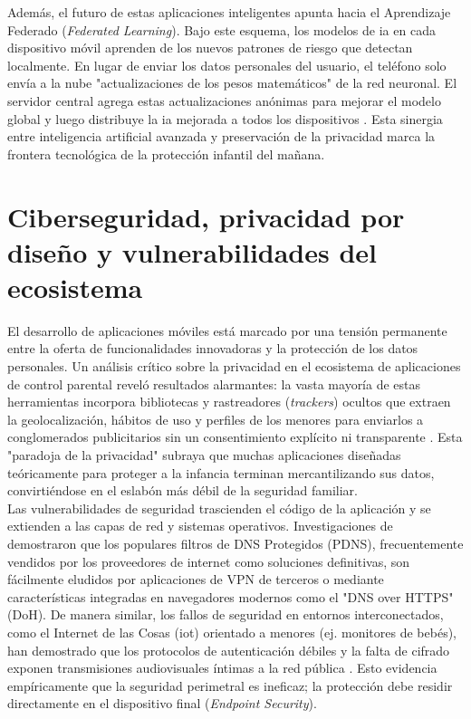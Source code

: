 Además, el futuro de estas aplicaciones inteligentes apunta hacia el Aprendizaje Federado (\textit{Federated Learning}). Bajo este esquema, los modelos de \gls{ia} en cada dispositivo móvil aprenden de los nuevos patrones de riesgo que detectan localmente. En lugar de enviar los datos personales del usuario, el teléfono solo envía a la nube "actualizaciones de los pesos matemáticos" de la red neuronal. El servidor central agrega estas actualizaciones anónimas para mejorar el modelo global y luego distribuye la \gls{ia} mejorada a todos los dispositivos \cite{oladimeji_smart_2023}. Esta sinergia entre inteligencia artificial avanzada y preservación de la privacidad marca la frontera tecnológica de la protección infantil del mañana.\\

\section{Ciberseguridad, privacidad por diseño y vulnerabilidades del ecosistema}

El desarrollo de aplicaciones móviles está marcado por una tensión permanente entre la oferta de funcionalidades innovadoras y la protección de los datos personales. Un análisis crítico sobre la privacidad en el ecosistema de aplicaciones de control parental reveló resultados alarmantes: la vasta mayoría de estas herramientas incorpora bibliotecas y rastreadores (\textit{trackers}) ocultos que extraen la geolocalización, hábitos de uso y perfiles de los menores para enviarlos a conglomerados publicitarios sin un consentimiento explícito ni transparente \cite{feal_angel_2020}. Esta "paradoja de la privacidad" subraya que muchas aplicaciones diseñadas teóricamente para proteger a la infancia terminan mercantilizando sus datos, convirtiéndose en el eslabón más débil de la seguridad familiar.\\

Las vulnerabilidades de seguridad trascienden el código de la aplicación y se extienden a las capas de red y sistemas operativos. Investigaciones de \cite{rojas_technical_2025} demostraron que los populares filtros de DNS Protegidos (PDNS), frecuentemente vendidos por los proveedores de internet como soluciones definitivas, son fácilmente eludidos por aplicaciones de VPN de terceros o mediante características integradas en navegadores modernos como el "DNS over HTTPS" (DoH). De manera similar, los fallos de seguridad en entornos interconectados, como el Internet de las Cosas (\gls{iot}) orientado a menores (ej. monitores de bebés), han demostrado que los protocolos de autenticación débiles y la falta de cifrado exponen transmisiones audiovisuales íntimas a la red pública \cite{schmidt_assessing_2023}. Esto evidencia empíricamente que la seguridad perimetral es ineficaz; la protección debe residir directamente en el dispositivo final (\textit{Endpoint Security}).\\



